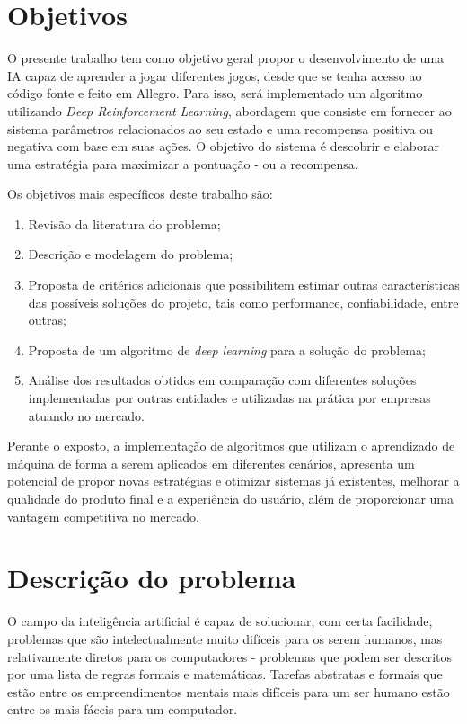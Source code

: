\section{Objetivos}
 O presente trabalho tem como objetivo geral propor o desenvolvimento de uma IA capaz de aprender a jogar diferentes jogos, desde que se tenha acesso ao código fonte e feito em Allegro. Para isso, será implementado um algoritmo utilizando \textit{Deep Reinforcement Learning}, abordagem que consiste em fornecer ao sistema parâmetros relacionados ao seu estado e uma recompensa positiva ou negativa com base em suas ações. 
 O objetivo do sistema é descobrir e elaborar uma estratégia para maximizar a pontuação - ou a recompensa.

 Os objetivos mais específicos deste trabalho são:
 \begin{enumerate}
 	\item Revisão da literatura do problema;
 	\item Descrição e modelagem do problema;
 	\item Proposta de critérios adicionais que possibilitem estimar outras características das possíveis soluções do projeto, tais como performance, confiabilidade, entre outras;
 	\item Proposta de um algoritmo de \textit{deep learning} para a solução do problema;
 	\item Análise dos resultados obtidos em comparação com diferentes soluções implementadas por outras entidades e utilizadas na prática por empresas atuando no mercado.
 \end{enumerate}

 Perante o exposto, a implementação de algoritmos que utilizam o aprendizado de máquina de forma a serem aplicados em diferentes cenários,
 apresenta um potencial de propor novas estratégias e otimizar sistemas já existentes, melhorar a qualidade do produto final e a experiência do usuário, além de proporcionar uma vantagem competitiva no mercado.

\section{Descrição do problema}
O campo da inteligência artificial é capaz de solucionar, com certa facilidade, problemas que são intelectualmente muito difíceis para os serem humanos, mas relativamente diretos para os computadores - problemas que podem ser descritos por uma lista de regras formais e matemáticas. Tarefas abstratas e formais que estão entre os empreendimentos mentais mais difíceis para um ser humano estão entre os mais fáceis para um computador.

